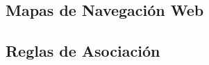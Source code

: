 \subsection{Mapas de Navegación Web}
\label{sec:srw:md:mnw}
%






\subsection{Reglas de Asociación}
\label{sec:srw:md:ra}





